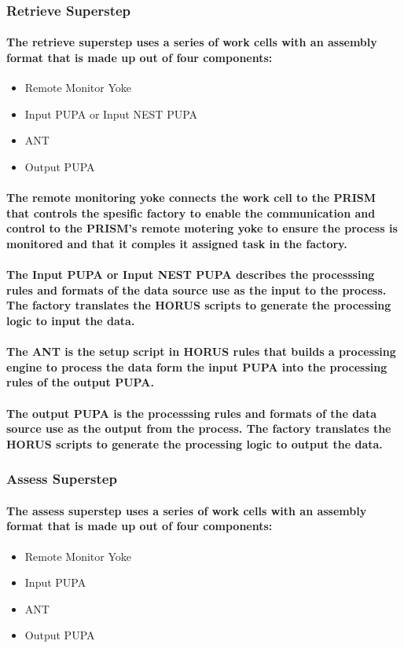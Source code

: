 \documentclass{acm_proc_article-sp}
\begin{document}
\subsubsection{Retrieve Superstep}
\paragraph{The retrieve superstep uses a series of work cells with an assembly format that is made up out of four components:}
\begin{itemize}
\item{Remote Monitor Yoke}
\item{Input PUPA or Input NEST PUPA}
\item{ANT}
\item{Output PUPA}
\end{itemize}
\paragraph{The remote monitoring yoke connects the work cell to the PRISM that controls the spesific factory to enable the communication and control to the PRISM's remote motering yoke to ensure the process is monitored and that it comples it assigned task in the factory.}
\paragraph{The Input PUPA or Input NEST PUPA describes the processsing rules and formats of the data source use as the input to the process. The factory translates the HORUS scripts to generate the processing logic to input the data.}
\paragraph{The ANT is the setup script in HORUS rules that builds a processing engine to process the data form the input PUPA into the processing rules of the output PUPA. }
\paragraph{The output PUPA is the processsing rules and formats of the data source use as the output from the process. The factory translates the HORUS scripts to generate the processing logic to output the data.}
\subsubsection{Assess Superstep}
\paragraph{The assess superstep uses a series of work cells with an assembly format that is made up out of four components:}
\begin{itemize}
\item{Remote Monitor Yoke}
\item{Input PUPA}
\item{ANT}
\item{Output PUPA}
\end{itemize}
\end{document}
